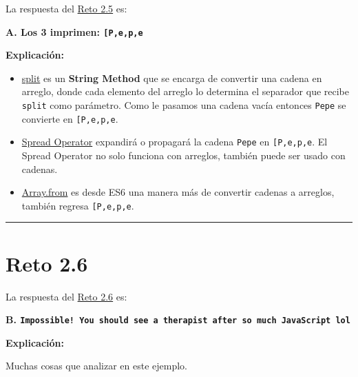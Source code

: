 \documentclass[
  letterpaper,
  DIV=11,
  numbers=noendperiod]{scrreprt}
\begin{document}
La respuesta del \hyperref[sec-cap2-reto5]{Reto 2.5} es:

\textbf{A. Los 3 imprimen:
\texttt{{[}\textquotesingle{}P\textquotesingle{},\textquotesingle{}e\textquotesingle{},\textquotesingle{}p\textquotesingle{},\textquotesingle{}e\textquotesingle{}{]}}}

\textbf{Explicación:}

\begin{itemize}
\item
  \hyperref[glos-split]{split} es un \textbf{String Method} que se
  encarga de convertir una cadena en arreglo, donde cada elemento del
  arreglo lo determina el separador que recibe \texttt{split} como
  parámetro. Como le pasamos una cadena vacía entonces \texttt{Pepe} se
  convierte en
  \texttt{{[}\textquotesingle{}P\textquotesingle{},\textquotesingle{}e\textquotesingle{},\textquotesingle{}p\textquotesingle{},\textquotesingle{}e\textquotesingle{}{]}}.
\item
  \hyperref[glos-spread_operator]{Spread Operator} expandirá o propagará
  la cadena \texttt{Pepe} en
  \texttt{{[}\textquotesingle{}P\textquotesingle{},\textquotesingle{}e\textquotesingle{},\textquotesingle{}p\textquotesingle{},\textquotesingle{}e\textquotesingle{}{]}}.
  El Spread Operator no solo funciona con arreglos, también puede ser
  usado con cadenas.
\item
  \hyperref[glos-array_from]{Array.from} es desde ES6 una manera más de
  convertir cadenas a arreglos, también regresa
  \texttt{{[}\textquotesingle{}P\textquotesingle{},\textquotesingle{}e\textquotesingle{},\textquotesingle{}p\textquotesingle{},\textquotesingle{}e\textquotesingle{}{]}}.
\end{itemize}

\begin{center}\rule{0.5\linewidth}{0.5pt}\end{center}

\section{Reto 2.6}\label{sec-sol-cap2-reto6}

La respuesta del \hyperref[sec-cap2-reto6]{Reto 2.6} es:

\textbf{B.
\texttt{Impossible!\ You\ should\ see\ a\ therapist\ after\ so\ much\ JavaScript\ lol}}

\textbf{Explicación:}

Muchas cosas que analizar en este ejemplo.
\end{document}
